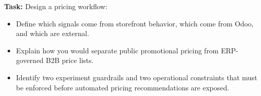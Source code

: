 \textbf{Task:} Design a pricing workflow:
\begin{itemize}
  \item Define which signals come from storefront behavior, which come from Odoo, and which are external.
  \item Explain how you would separate public promotional pricing from ERP-governed B2B price lists.
  \item Identify two experiment guardrails and two operational constraints that must be enforced before automated pricing recommendations are exposed.
\end{itemize}
